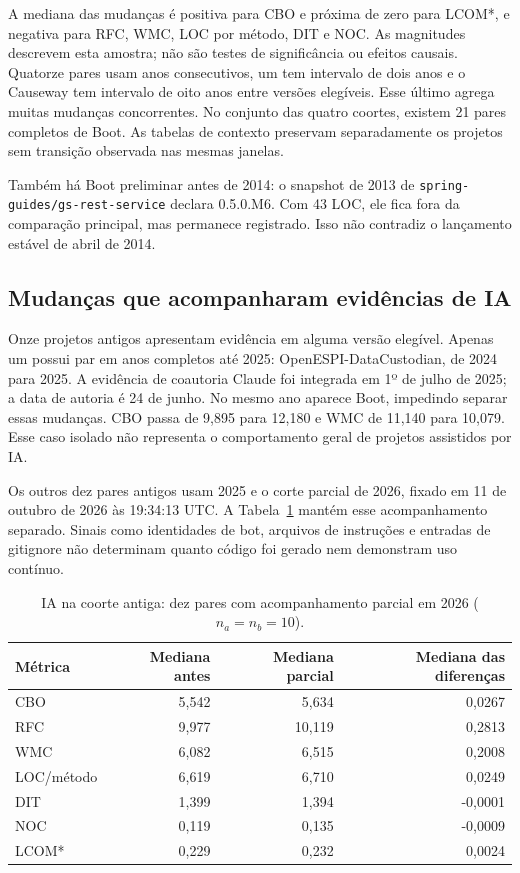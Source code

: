 A mediana das mudanças é positiva para CBO e próxima de zero para LCOM*, e negativa para RFC, WMC, LOC por método, DIT e NOC. As magnitudes descrevem esta amostra; não são testes de significância ou efeitos causais. Quatorze pares usam anos consecutivos, um tem intervalo de dois anos e o Causeway tem intervalo de oito anos entre versões elegíveis. Esse último agrega muitas mudanças concorrentes. No conjunto das quatro coortes, existem 21 pares completos de Boot. As tabelas de contexto preservam separadamente os projetos sem transição observada nas mesmas janelas.

Também há Boot preliminar antes de 2014: o snapshot de 2013 de \texttt{spring-guides/gs-rest-service} declara 0.5.0.M6. Com 43 LOC, ele fica fora da comparação principal, mas permanece registrado. Isso não contradiz o lançamento estável de abril de 2014.

\subsection{Mudanças que acompanharam evidências de IA}

Onze projetos antigos apresentam evidência em alguma versão elegível. Apenas um possui par em anos completos até 2025: OpenESPI-DataCustodian, de 2024 para 2025. A evidência de coautoria Claude foi integrada em 1º de julho de 2025; a data de autoria é 24 de junho. No mesmo ano aparece Boot, impedindo separar essas mudanças. CBO passa de 9,895 para 12,180 e WMC de 11,140 para 10,079. Esse caso isolado não representa o comportamento geral de projetos assistidos por IA.

Os outros dez pares antigos usam 2025 e o corte parcial de 2026, fixado em 11 de outubro de 2026 às 19:34:13 UTC. A Tabela~\ref{tab:historico-ia-parcial} mantém esse acompanhamento separado. Sinais como identidades de bot, arquivos de instruções e entradas de gitignore não determinam quanto código foi gerado nem demonstram uso contínuo.

\begin{table}[htbp]
\centering\small
\caption{IA na coorte antiga: dez pares com acompanhamento parcial em 2026 ($n_a=n_b=10$).}
\label{tab:historico-ia-parcial}
\begin{tabular}{lrrr}
\hline
Métrica & Mediana antes & Mediana parcial & Mediana das diferenças \\
\hline
CBO & 5,542 & 5,634 & 0,0267 \\
RFC & 9,977 & 10,119 & 0,2813 \\
WMC & 6,082 & 6,515 & 0,2008 \\
LOC/método & 6,619 & 6,710 & 0,0249 \\
DIT & 1,399 & 1,394 & -0,0001 \\
NOC & 0,119 & 0,135 & -0,0009 \\
LCOM* & 0,229 & 0,232 & 0,0024 \\
\hline
\end{tabular}
\end{table}

